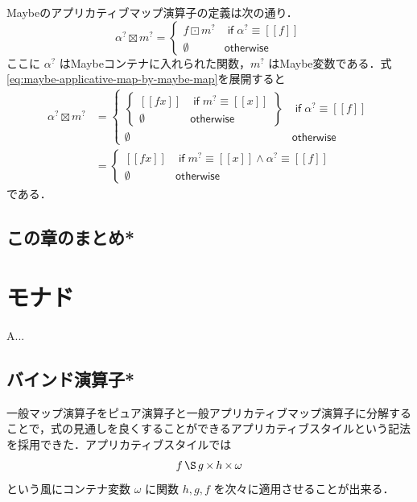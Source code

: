 \documentclass[a4paper]{jsbook}
\def\[{\left[\!\left[}
\def\]{\right]\!\right]}
\newenvironment{leader}{\begingroup}{\endgroup}
\newcommand{\mNothing}{\emptyset}
\newcommand{\mKeyword}[1]{\mathsf{#1}}
\newcommand{\mIfKeyword}{\mKeyword{if}}
\newcommand{\mOtherwiseKeyword}{\mKeyword{otherwise}}
\newcommand{\mMaybeWith}[1]{\[#1\]}
\newcommand{\mMaybe}[1]{{#1}^\text{?}}
\DeclareMathOperator{\mMapMaybe}{\boxdot}
\DeclareMathOperator{\mApplicativeApply}{\S}
\DeclareMathOperator{\mApplicativeMap}{\times}
\DeclareMathOperator{\mApplicativeMapMaybe}{\boxtimes}
\DeclareMathOperator{\mLogicalAnd}{\wedge}
\DeclareMathOperator{\mIf}{\mIfKeyword}
\DeclareMathOperator{\mOtherwise}{\mOtherwiseKeyword}
\begin{document}
Maybeのアプリカティブマップ演算子の定義は次の通り．
\begin{equation}
\label{eq:maybe-applicative-map-by-maybe-map}
\mMaybe{\alpha}\mApplicativeMapMaybe\mMaybe{m}
=\begin{cases}
f\mMapMaybe\mMaybe{m}&\mIf\mMaybe{\alpha}\equiv\mMaybeWith{f}\\
\mNothing&\mOtherwise
\end{cases}
\end{equation}
ここに $\mMaybe{\alpha}$ はMaybeコンテナに入れられた関数，$\mMaybe{m}$ はMaybe変数である．式\eqref{eq:maybe-applicative-map-by-maybe-map}を展開すると
\begin{align}
\mMaybe{\alpha}\mApplicativeMapMaybe\mMaybe{m}
&=\begin{cases}
\left\{
\begin{array}{ll}
\mMaybeWith{fx}&\mIf\mMaybe{m}\equiv\mMaybeWith{x}\\
\mNothing&\mOtherwise
\end{array}\right\}
&\mIf\mMaybe{\alpha}\equiv\mMaybeWith{f}\\
\mNothing&\mOtherwise
\end{cases}\\
&=\begin{cases}
\mMaybeWith{fx}&\mIf\mMaybe{m}\equiv\mMaybeWith{x}\mLogicalAnd\mMaybe{\alpha}\equiv\mMaybeWith{f}\\
\mNothing&\mOtherwise
\end{cases}
\end{align}
である．

\section*{この章のまとめ*}

\chapter{モナド}

\begin{leader}
A...
\end{leader}


\section{バインド演算子*}


一般マップ演算子をピュア演算子と一般アプリカティブマップ演算子に分解することで，式の見通しを良くすることができるアプリカティブスタイルという記法を採用できた．アプリカティブスタイルでは
\begin{equation}
f\mApplicativeApply g\mApplicativeMap h\mApplicativeMap\omega
\end{equation}
という風にコンテナ変数 $\omega$ に関数 $h,g,f$ を次々に適用させることが出来る．
\end{document}
